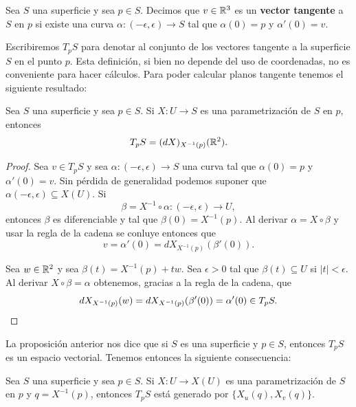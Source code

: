 
\begin{definition}
	Sea $S$ una superficie y sea $p\in S$. Decimos que $v\in\mathbb{R}^3$ es
	un \textbf{vector tangente} a $S$ en $p$ si existe una curva
	$\alpha\colon(-\epsilon,\epsilon)\to S$ tal que $\alpha(0)=p$ y
	$\alpha'(0)=v$. 
\end{definition}

Escribiremos $T_pS$ para denotar al conjunto de los vectores tangente a la
superficie $S$ en el punto $p$. Esta definición, si bien no depende del uso de
coordenadas, no es conveniente para hacer cálculos.  Para poder calcular planos
tangente tenemos el siguiente resultado:

\begin{proposition}
	Sea $S$ una superficie y sea $p\in S$. Si $X\colon 	U\to S$ es una
	parametrización de $S$ en $p$, entonces
	\[
		T_pS=(dX)_{X^{-1}(p)}(\mathbb{R}^2).
	\]
\end{proposition}

\begin{proof}
	Sea $v\in T_pS$ y sea $\alpha\colon(-\epsilon,\epsilon)\to S$ una curva tal que
	$\alpha(0)=p$ y $\alpha'(0)=v$. Sin pérdida de generalidad podemos suponer
	que $\alpha(-\epsilon,\epsilon)\subseteq X(U)$. Si 
	\[
		\beta=X^{-1}\circ\alpha\colon (-\epsilon,\epsilon)\to U,
	\]
	entonces $\beta$ es diferenciable y tal que $\beta(0)=X^{-1}(p)$. Al
	derivar $\alpha=X\circ\beta$ y usar la regla de la cadena se
	conluye entonces que 
	\[
		v=\alpha'(0)=dX_{X^{-1}(p)}(\beta'(0)).
	\]

	Sea $w\in\mathbb{R}^2$ y sea $\beta(t)=X^{-1}(p)+tw$. Sea $\epsilon>0$ tal que
	$\beta(t)\subseteq U$ si $|t|<\epsilon$. Al derivar $X\circ\beta=\alpha$
	obtenemos, gracias a la regla de la cadena, que 
	\[
		dX_{X^{-1}(p)}(w)=dX_{X^{-1}(p)}(\beta'(0))=\alpha'(0)\in T_pS.\qedhere
	\]
\end{proof}

La proposición anterior nos dice que si $S$ es una superficie y $p\in S$, entonces
$T_pS$ es un espacio vectorial. Tenemos entonces la siguiente consecuencia: 

\begin{proposition}
	Sea $S$ una superficie y sea $p\in S$. 
	Si $X\colon U\to X(U)$ es una parametrización de $S$
	en $p$ y $q=X^{-1}(p)$, entonces $T_pS$ está generado por
	$\{X_u(q),X_v(q)\}$. 
\end{proposition}

